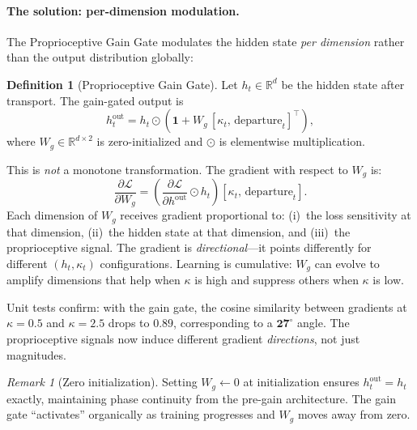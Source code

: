 \documentclass[11pt,a4paper]{article}
\theoremstyle{definition}
\newtheorem{definition}[theorem]{Definition}
\theoremstyle{remark}
\newtheorem{remark}[theorem]{Remark}
\begin{document}
\paragraph{The solution: per-dimension modulation.}
The Proprioceptive Gain Gate modulates the hidden state 
\emph{per dimension} rather than the output distribution globally:

\begin{definition}[Proprioceptive Gain Gate]\label{def:gain_gate}
Let $h_t \in \mathbb{R}^d$ be the hidden state after transport. 
The gain-gated output is
\begin{equation}\label{eq:gain_gate}
    h_t^{\mathrm{out}} = h_t \odot \left(\mathbf{1} + 
    W_g\,[\kappa_t,\,\mathrm{departure}_t]^\top\right),
\end{equation}
where $W_g \in \mathbb{R}^{d \times 2}$ is zero-initialized and 
$\odot$ is elementwise multiplication.
\end{definition}

This is \emph{not} a monotone transformation. The gradient with 
respect to $W_g$ is:
\begin{equation}\label{eq:gain_gradient}
    \frac{\partial\mathcal{L}}{\partial W_g} = 
    \left(\frac{\partial\mathcal{L}}{\partial h^{\mathrm{out}}} 
    \odot h_t\right) [\kappa_t,\,\mathrm{departure}_t].
\end{equation}
Each dimension of $W_g$ receives gradient proportional to: 
(i)~the loss sensitivity at that dimension, (ii)~the hidden 
state at that dimension, and (iii)~the proprioceptive signal. 
The gradient is \emph{directional}---it points differently for 
different $(h_t, \kappa_t)$ configurations. Learning is cumulative: 
$W_g$ can evolve to amplify dimensions that help when $\kappa$ 
is high and suppress others when $\kappa$ is low.

Unit tests confirm: with the gain gate, the cosine similarity 
between gradients at $\kappa = 0.5$ and $\kappa = 2.5$ drops to 
$\mathbf{0.89}$, corresponding to a $\mathbf{27^\circ}$ angle. 
The proprioceptive signals now induce different gradient 
\emph{directions}, not just magnitudes.

\begin{remark}[Zero initialization]
Setting $W_g \leftarrow 0$ at initialization ensures 
$h_t^{\mathrm{out}} = h_t$ exactly, maintaining phase continuity 
from the pre-gain architecture. The gain gate ``activates'' 
organically as training progresses and $W_g$ moves away from zero.
\end{remark}
\end{document}
